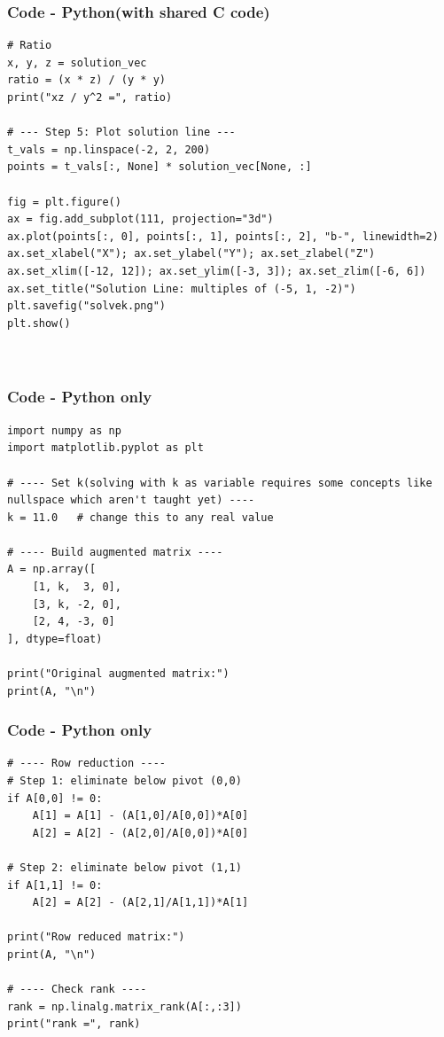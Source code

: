 \documentclass{beamer}
\theoremstyle{remark}
\numberwithin{equation}{section}
\begin{document}
\begin{frame}[fragile]
\frametitle{Code - Python(with shared C code)}
\begin{lstlisting}
# Ratio
x, y, z = solution_vec
ratio = (x * z) / (y * y)
print("xz / y^2 =", ratio)

# --- Step 5: Plot solution line ---
t_vals = np.linspace(-2, 2, 200)
points = t_vals[:, None] * solution_vec[None, :]

fig = plt.figure()
ax = fig.add_subplot(111, projection="3d")
ax.plot(points[:, 0], points[:, 1], points[:, 2], "b-", linewidth=2)
ax.set_xlabel("X"); ax.set_ylabel("Y"); ax.set_zlabel("Z")
ax.set_xlim([-12, 12]); ax.set_ylim([-3, 3]); ax.set_zlim([-6, 6])
ax.set_title("Solution Line: multiples of (-5, 1, -2)")
plt.savefig("solvek.png")
plt.show()



\end{lstlisting}
\end{frame}




\begin{frame}[fragile]
\frametitle{Code - Python only}
\begin{lstlisting}
import numpy as np
import matplotlib.pyplot as plt

# ---- Set k(solving with k as variable requires some concepts like nullspace which aren't taught yet) ----
k = 11.0   # change this to any real value

# ---- Build augmented matrix ----
A = np.array([
    [1, k,  3, 0],
    [3, k, -2, 0],
    [2, 4, -3, 0]
], dtype=float)

print("Original augmented matrix:")
print(A, "\n")

\end{lstlisting}
\end{frame}

\begin{frame}[fragile]
\frametitle{Code - Python only}
\begin{lstlisting}
# ---- Row reduction ----
# Step 1: eliminate below pivot (0,0)
if A[0,0] != 0:
    A[1] = A[1] - (A[1,0]/A[0,0])*A[0]
    A[2] = A[2] - (A[2,0]/A[0,0])*A[0]

# Step 2: eliminate below pivot (1,1)
if A[1,1] != 0:
    A[2] = A[2] - (A[2,1]/A[1,1])*A[1]

print("Row reduced matrix:")
print(A, "\n")

# ---- Check rank ----
rank = np.linalg.matrix_rank(A[:,:3])
print("rank =", rank)


\end{lstlisting}
\end{frame}
\end{document}

